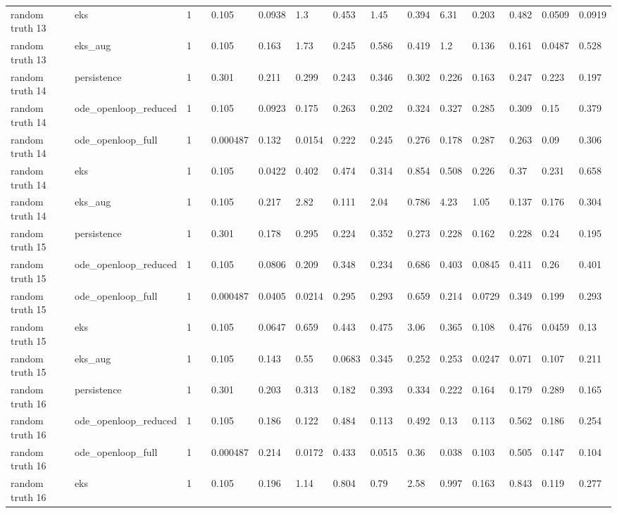 \begin{table}[t]
\begin{tabular}{lllllllllllllll}
random truth 13 & eks & 1 &  & 0.105 & 0.0938 & 1.3 & 0.453 & 1.45 & 0.394 & 6.31 & 0.203 & 0.482 & 0.0509 & 0.0919 \\
random truth 13 & eks\_aug & 1 &  & 0.105 & 0.163 & 1.73 & 0.245 & 0.586 & 0.419 & 1.2 & 0.136 & 0.161 & 0.0487 & 0.528 \\
random truth 14 & persistence & 1 &  & 0.301 & 0.211 & 0.299 & 0.243 & 0.346 & 0.302 & 0.226 & 0.163 & 0.247 & 0.223 & 0.197 \\
random truth 14 & ode\_openloop\_reduced & 1 &  & 0.105 & 0.0923 & 0.175 & 0.263 & 0.202 & 0.324 & 0.327 & 0.285 & 0.309 & 0.15 & 0.379 \\
random truth 14 & ode\_openloop\_full & 1 &  & 0.000487 & 0.132 & 0.0154 & 0.222 & 0.245 & 0.276 & 0.178 & 0.287 & 0.263 & 0.09 & 0.306 \\
random truth 14 & eks & 1 &  & 0.105 & 0.0422 & 0.402 & 0.474 & 0.314 & 0.854 & 0.508 & 0.226 & 0.37 & 0.231 & 0.658 \\
random truth 14 & eks\_aug & 1 &  & 0.105 & 0.217 & 2.82 & 0.111 & 2.04 & 0.786 & 4.23 & 1.05 & 0.137 & 0.176 & 0.304 \\
random truth 15 & persistence & 1 &  & 0.301 & 0.178 & 0.295 & 0.224 & 0.352 & 0.273 & 0.228 & 0.162 & 0.228 & 0.24 & 0.195 \\
random truth 15 & ode\_openloop\_reduced & 1 &  & 0.105 & 0.0806 & 0.209 & 0.348 & 0.234 & 0.686 & 0.403 & 0.0845 & 0.411 & 0.26 & 0.401 \\
random truth 15 & ode\_openloop\_full & 1 &  & 0.000487 & 0.0405 & 0.0214 & 0.295 & 0.293 & 0.659 & 0.214 & 0.0729 & 0.349 & 0.199 & 0.293 \\
random truth 15 & eks & 1 &  & 0.105 & 0.0647 & 0.659 & 0.443 & 0.475 & 3.06 & 0.365 & 0.108 & 0.476 & 0.0459 & 0.13 \\
random truth 15 & eks\_aug & 1 &  & 0.105 & 0.143 & 0.55 & 0.0683 & 0.345 & 0.252 & 0.253 & 0.0247 & 0.071 & 0.107 & 0.211 \\
random truth 16 & persistence & 1 &  & 0.301 & 0.203 & 0.313 & 0.182 & 0.393 & 0.334 & 0.222 & 0.164 & 0.179 & 0.289 & 0.165 \\
random truth 16 & ode\_openloop\_reduced & 1 &  & 0.105 & 0.186 & 0.122 & 0.484 & 0.113 & 0.492 & 0.13 & 0.113 & 0.562 & 0.186 & 0.254 \\
random truth 16 & ode\_openloop\_full & 1 &  & 0.000487 & 0.214 & 0.0172 & 0.433 & 0.0515 & 0.36 & 0.038 & 0.103 & 0.505 & 0.147 & 0.104 \\
random truth 16 & eks & 1 &  & 0.105 & 0.196 & 1.14 & 0.804 & 0.79 & 2.58 & 0.997 & 0.163 & 0.843 & 0.119 & 0.277 \\

\end{tabular}
\end{table}
